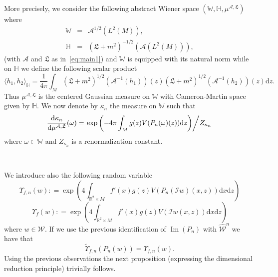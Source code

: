 \documentclass[a4paper,10pt]{article}
\newcommand{\mathd}{\mathrm{d}}
\newcommand{\nobracket}{}
\newcommand{\tmop}[1]{\ensuremath{\operatorname{#1}}}
\begin{document}
More precisely, we consider the following abstract Wiener space $(\mathbb{W},
\mathbb{H}, \mu^{\mathcal{A}, \mathfrak{L}})$ where
\begin{eqnarray}
  \mathbb{W} & = & \mathcal{A}^{1 / 2} (L^2 (M)), \nonumber\\
  \mathbb{H} & = & (\mathcal{\mathfrak{L}} + m^2)^{- 1 / 2} (\mathcal{A} (L^2
  (M))), \nonumber
\end{eqnarray}
(with $\mathcal{A}$ and $\mathfrak{L}$ as in~{\eqref{eq:main1}}) and
$\mathbb{W}$ is equipped with its natural norm while on $\mathbb{H}$ we define
the following scalar product
\begin{equation}
  \langle h_1, h_2 \rangle_{\mathbb{H}} = \frac{1}{4 \pi} \int_M (\mathfrak{L}
  + m^2)^{1 / 2} (\mathcal{A}^{- 1} (h_1)) (z) (\mathfrak{L} + m^2)^{1 / 2}
  (\mathcal{A}^{- 1} (h_2)) (z) \mathd z. \label{eq:covariance1}
\end{equation}
Thus $\mu^{\mathcal{A}, \mathfrak{L}}$ is the centered Gaussian measure on
$\mathbb{W}$ with Cameron-Martin space given by $\mathbb{H}$. We now denote by
$\kappa_n$ the measure on $\mathbb{W}$ such that
\begin{equation}
  \frac{\mathd \kappa_n}{\mathd \mu^{\mathcal{A} \mathfrak{, L}}} (\omega) =
  \left. \exp \left( - 4 \pi \int_M g (z) V (P_n (\mathcal{} \nobracket
  \omega) \nobracket (z)) \mathd z \right) \middle/ Z_{\kappa_n} \right.
  \label{eq:kappa1}
\end{equation}
where $\omega \in \mathbb{W}$ and $Z_{\kappa_n}$ is a renormalization
constant.

\

We introduce also the following random variable
\begin{equation}
  \Upsilon_{f, n} (w) : = \exp \left( 4 \int_{\mathbb{R}^2 \times M} f' (x) g
  (z) V (\mathcal{} P_n (\mathcal{I} w) (x, z)) \mathd x \mathd z \right)
\end{equation}
\begin{equation}
  \Upsilon_f (w) : = \exp \left( 4 \int_{\mathbb{R}^2 \times M} f' (x) g (z) V
  (\mathcal{} \mathcal{I} w (x, z)) \mathd x \mathd z \right)
  \label{eq:Upsilon}
\end{equation}
where $w \in \mathcal{W}$. If we use the previous identification of $\tmop{Im}
(P_n)$ with $\widehat{\mathcal{W}}^n$ we have that
\[ \tilde{\Upsilon}_{f, n} (P_n (w)) = \Upsilon_{f, n} (w) . \]
Using the previous observations the next proposition (expressing the
dimensional reduction principle) trivially follows.
\end{document}
